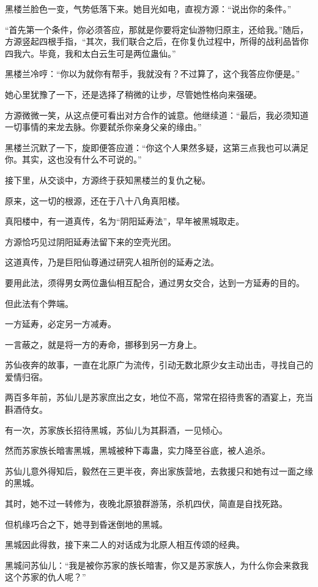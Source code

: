 \begin{this_body}
黑楼兰脸色一变，气势低落下来。她目光如电，直视方源：“说出你的条件。”

“首先第一个条件，你必须答应，那就是你要将定仙游物归原主，还给我。”随后，方源竖起四根手指，“其次，我们联合之后，在你复仇过程中，所得的战利品皆你四我六。毕竟，我和太白云生可是两位蛊仙。”

黑楼兰冷哼：“你以为就你有帮手，我就没有？不过算了，这个我答应你便是。”

她心里犹豫了一下，还是选择了稍微的让步，尽管她性格向来强硬。

方源微微一笑，从这点便可看出对方合作的诚意。他继续道：“最后，我必须知道一切事情的来龙去脉。你要弑杀你亲身父亲的缘由。”

黑楼兰沉默了一下，旋即便答应道：“你这个人果然多疑，这第三点我也可以满足你。其实，这也没有什么不可说的。”

接下里，从交谈中，方源终于获知黑楼兰的复仇之秘。

原来，这一切的根源，还在于八十八角真阳楼。

真阳楼中，有一道真传，名为“阴阳延寿法”，早年被黑城取走。

方源恰巧见过阴阳延寿法留下来的空壳光团。

这道真传，乃是巨阳仙尊通过研究人祖所创的延寿之法。

要用此法，须得男女两位蛊仙相互配合，通过男女交合，达到一方延寿的目的。

但此法有个弊端。

一方延寿，必定另一方减寿。

一言蔽之，就是将一方的寿命，挪移到另一方身上。

苏仙夜奔的故事，一直在北原广为流传，引动无数北原少女主动出击，寻找自己的爱情归宿。

两百多年前，苏仙儿是苏家庶出之女，地位不高，常常在招待贵客的酒宴上，充当斟酒侍女。

有一次，苏家族长招待黑城，苏仙儿为其斟酒，一见倾心。

然而苏家族长暗害黑城，黑城被种下毒蛊，实力降至谷底，被人追杀。

苏仙儿意外得知后，毅然在三更半夜，奔出家族营地，去救援只和她有过一面之缘的黑城。

其时，她不过一转修为，夜晚北原狼群游荡，杀机四伏，简直是自找死路。

但机缘巧合之下，她寻到昏迷倒地的黑城。

黑城因此得救，接下来二人的对话成为北原人相互传颂的经典。

黑城问苏仙儿：“我是被你苏家的族长暗害，你又是苏家族人，为什么你会来救我这个苏家的仇人呢？”


\end{this_body}
